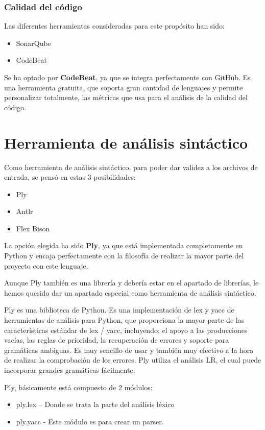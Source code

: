 \subsubsection{Calidad del código}
Las diferentes herramientas consideradas para este propósito han sido: 
\begin{itemize}
\item SonarQube
\item CodeBeat
\end{itemize}

Se ha optado por \textbf{CodeBeat}, ya que se integra perfectamente con GitHub. Es una herramienta gratuita, que soporta gran cantidad de lenguajes y permite personalizar totalmente, las métricas que usa para el análisis de la calidad del código.

\section{Herramienta de análisis sintáctico}

Como herramienta de análisis sintáctico, para poder dar validez a los archivos de entrada, se pensó en estas 3 posibilidades:
\begin{itemize}
\item Ply
\item Antlr
\item Flex Bison
\end{itemize}

La opción elegida ha sido \textbf{Ply}, ya que está implementada completamente en Python y encaja perfectamente con la filosofía de realizar la mayor parte del proyecto con este lenguaje.

Aunque Ply también es una librería y debería estar en el apartado de librerías, le hemos querido dar un apartado especial como herramienta de análisis sintáctico.

Ply es una biblioteca de Python. Es una implementación de lex y yacc de herramientas de análisis para Python, que proporciona la mayor parte de las características estándar de lex / yacc, incluyendo; el apoyo a las producciones vacías, las reglas de prioridad, la recuperación de errores y soporte para gramáticas ambiguas. Es muy sencillo de usar y también muy efectivo a la hora de realizar la comprobación de los errores. Ply utiliza el análisis LR, el cual puede incorporar grandes gramáticas fácilmente.

Ply, básicamente está compuesto de 2 módulos:
\begin{itemize}
\item ply.lex – Donde se trata la parte del análisis léxico
\item ply.yacc -  Este módulo es para crear un parser.
\end{itemize}

